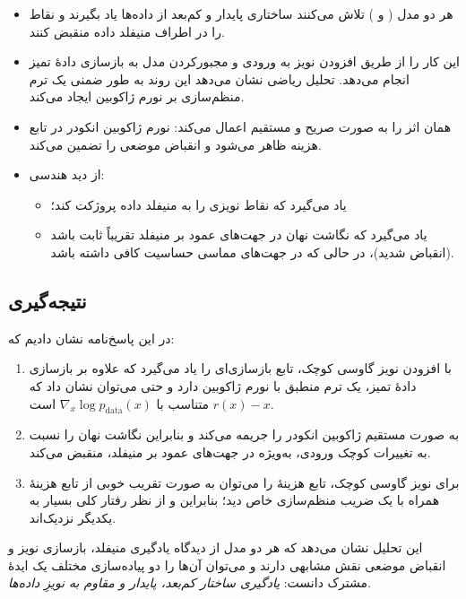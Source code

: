 \documentclass{article}
\begin{document}
\begin{itemize}
	\item هر دو مدل ( و ) تلاش می‌کنند ساختاری پایدار و کم‌بعد از داده‌ها یاد بگیرند و نقاط را در اطراف منیفلد داده منقبض کنند.
	\item {} این کار را از طریق افزودن نویز به ورودی و مجبورکردن مدل به بازسازی دادهٔ تمیز انجام می‌دهد. تحلیل ریاضی نشان می‌دهد این روند به طور ضمنی یک ترم منظم‌سازی بر نورم ژاکوبین ایجاد می‌کند.
	\item {} همان اثر را به صورت صریح و مستقیم اعمال می‌کند: نورم ژاکوبین انکودر در تابع هزینه ظاهر می‌شود و انقباض موضعی را تضمین می‌کند.
	\item از دید هندسی:
	\begin{itemize}
		\item {} یاد می‌گیرد که نقاط نویزی را به منیفلد داده پروژکت کند؛
		\item {} یاد می‌گیرد که نگاشت نهان در جهت‌های عمود بر منیفلد تقریباً ثابت باشد (انقباض شدید)، در حالی که در جهت‌های مماسی حساسیت کافی داشته باشد.
	\end{itemize}
\end{itemize}

\subsection{نتیجه‌گیری}

در این پاسخ‌نامه نشان دادیم که:
\begin{enumerate}
	\item {} با افزودن نویز گاوسی کوچک، تابع بازسازی‌ای را یاد می‌گیرد که علاوه بر بازسازی دادهٔ تمیز، یک ترم منطبق با نورم ژاکوبین دارد و حتی می‌توان نشان داد که $r(x)-x$ متناسب با $\nabla_x \log p_{\text{data}}(x)$ است.
	\item {} به صورت مستقیم ژاکوبین انکودر را جریمه می‌کند و بنابراین نگاشت نهان را نسبت به تغییرات کوچک ورودی، به‌ویژه در جهت‌های عمود بر منیفلد، منقبض می‌کند.
	\item برای نویز گاوسی کوچک، تابع هزینهٔ  را می‌توان به صورت تقریب خوبی از تابع هزینهٔ  همراه با یک ضریب منظم‌سازی خاص دید؛ بنابراین  و  از نظر رفتار کلی بسیار به یکدیگر نزدیک‌اند.
\end{enumerate}

این تحلیل نشان می‌دهد که هر دو مدل از دیدگاه یادگیری منیفلد، بازسازی نویز و انقباض موضعی نقش مشابهی دارند و می‌توان آن‌ها را دو پیاده‌سازی مختلف یک ایدهٔ مشترک دانست: \emph{یادگیری ساختار کم‌بعد، پایدار و مقاوم به نویزِ داده‌ها}.
\end{document}
